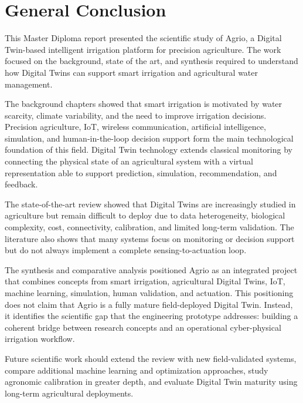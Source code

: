 \chapter*{General Conclusion}

This Master Diploma report presented the scientific study of Agrio, a Digital Twin-based intelligent irrigation platform for precision agriculture. The work focused on the background, state of the art, and synthesis required to understand how Digital Twins can support smart irrigation and agricultural water management.

The background chapters showed that smart irrigation is motivated by water scarcity, climate variability, and the need to improve irrigation decisions. Precision agriculture, IoT, wireless communication, artificial intelligence, simulation, and human-in-the-loop decision support form the main technological foundation of this field. Digital Twin technology extends classical monitoring by connecting the physical state of an agricultural system with a virtual representation able to support prediction, simulation, recommendation, and feedback.

The state-of-the-art review showed that Digital Twins are increasingly studied in agriculture but remain difficult to deploy due to data heterogeneity, biological complexity, cost, connectivity, calibration, and limited long-term validation. The literature also shows that many systems focus on monitoring or decision support but do not always implement a complete sensing-to-actuation loop.

The synthesis and comparative analysis positioned Agrio as an integrated project that combines concepts from smart irrigation, agricultural Digital Twins, IoT, machine learning, simulation, human validation, and actuation. This positioning does not claim that Agrio is a fully mature field-deployed Digital Twin. Instead, it identifies the scientific gap that the engineering prototype addresses: building a coherent bridge between research concepts and an operational cyber-physical irrigation workflow.

Future scientific work should extend the review with new field-validated systems, compare additional machine learning and optimization approaches, study agronomic calibration in greater depth, and evaluate Digital Twin maturity using long-term agricultural deployments.
